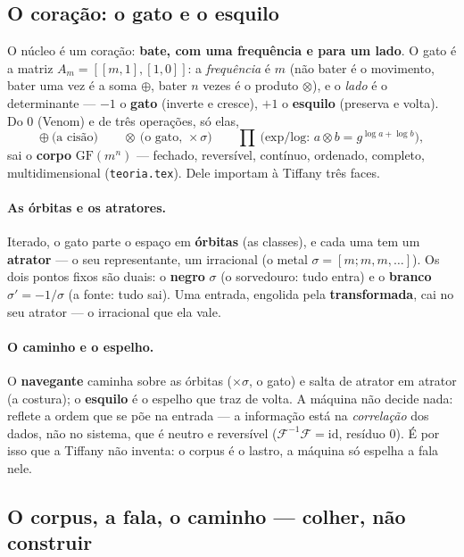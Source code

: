 \documentclass[11pt]{article}
\theoremstyle{plain}
\theoremstyle{remark}
\begin{document}
\subsection{O coração: o gato e o esquilo}

O núcleo é um coração: \textbf{bate, com uma frequência e para um lado}. O gato é a matriz
$A_m=[[m,1],[1,0]]$: a \emph{frequência} é $m$ (não bater é o movimento, bater uma vez é a soma
$\oplus$, bater $n$ vezes é o produto $\otimes$), e o \emph{lado} é o determinante --- $-1$ o
\textbf{gato} (inverte e cresce), $+1$ o \textbf{esquilo} (preserva e volta). Do $0$ (Venom) e de
três operações, só elas,
\[
 \oplus\ \text{(a cisão)}\qquad
 \otimes\ \text{(o gato, }\times\sigma\text{)}\qquad
 \textstyle\prod\ \text{(exp/log: } a\otimes b=g^{\log a+\log b}\text{)},
\]
sai o \textbf{corpo} $\mathrm{GF}(m^n)$ --- fechado, reversível, contínuo, ordenado, completo,
multidimensional (\texttt{teoria.tex}). Dele importam à Tiffany três faces.

\paragraph{As órbitas e os atratores.} Iterado, o gato parte o espaço em \textbf{órbitas} (as
classes), e cada uma tem um \textbf{atrator} --- o seu representante, um irracional (o metal
$\sigma=[m;m,m,\dots]$). Os dois pontos fixos são duais: o \textbf{negro} $\sigma$ (o sorvedouro:
tudo entra) e o \textbf{branco} $\sigma'=-1/\sigma$ (a fonte: tudo sai). Uma entrada, engolida pela
\textbf{transformada}, cai no seu atrator --- o irracional que ela vale.

\paragraph{O caminho e o espelho.} O \textbf{navegante} caminha sobre as órbitas ($\times\sigma$, o
gato) e salta de atrator em atrator (a costura); o \textbf{esquilo} é o espelho que traz de volta.
A máquina não decide nada: reflete a ordem que se põe na entrada --- a informação está na
\emph{correlação} dos dados, não no sistema, que é neutro e reversível ($\mathcal F^{-1}\mathcal
F=\mathrm{id}$, resíduo $0$). É por isso que a Tiffany não inventa: o corpus é o lastro, a máquina
só espelha a fala nele.

\subsection{O corpus, a fala, o caminho --- colher, não construir}
\end{document}
